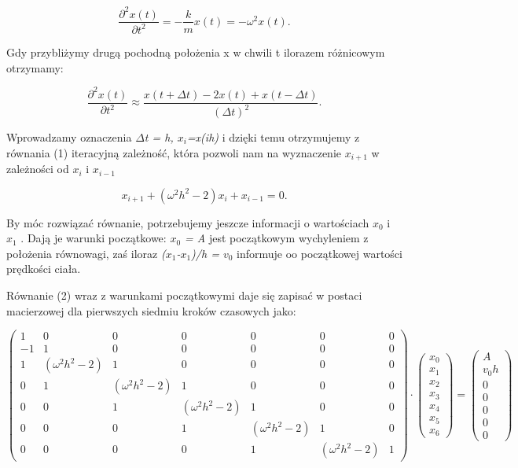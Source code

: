\documentclass{article}
\begin{document}
\begin{equation}
\frac{\partial ^2 x(t)}{\partial t^2} = - \frac{k}{m}x(t) = -\omega^2 x(t).
\end{equation}

Gdy przybliżymy drugą pochodną położenia x w chwili t ilorazem różnicowym otrzymamy:

\begin{equation}
\frac{\partial ^2 x(t)}{\partial t^2} \approx \frac{x(t+\Delta t) - 2x(t) + x(t-\Delta t)}{(\Delta t)^2}.
\end{equation}

Wprowadzamy oznaczenia \textit{$\Delta$t = h, $x_{i}$=x(ih)}  i dzięki temu otrzymujemy z równania (1) iteracyjną zależność, która pozwoli nam na wyznaczenie \textit{$x_{i+1}$} w zależności od \textit{$x_{i}$} i \textit{$x_{i-1}$}

\begin{equation}
x_{i+1} + (\omega ^2 h^2 - 2) x_{i} + x_{i-1} = 0.
\end{equation}
\par

By móc rozwiązać równanie, potrzebujemy  jeszcze informacji o wartościach \textit{$x_{0}$} i \textit{$x_{1}$} . Dają je warunki początkowe: \textit{$x_{0}$ = A} jest początkowym wychyleniem z położenia równowagi, zaś iloraz \textit{($x_{1}$-$x_{1}$)/h = $v_{0}$} informuje oo początkowej wartości prędkości ciała. \par
Równanie (2) wraz z warunkami początkowymi daje się zapisać w postaci macierzowej dla pierwszych siedmiu kroków czasowych jako:


\begin{equation}
	\begin{pmatrix}
		1 & 0 & 0 & 0 & 0 & 0 & 0 \\
		-1 & 1 & 0 & 0 & 0 & 0 & 0 \\
		1 & (\omega ^2 h^2 -2) & 1 & 0 & 0 & 0 & 0 \\
		0 & 1 & (\omega ^2 h^2 -2) & 1 & 0 & 0 & 0 \\
		0 & 0 & 1 & (\omega ^2 h^2 -2) & 1 & 0 & 0 \\
		0 & 0 & 0 & 1 & (\omega ^2 h^2 -2)& 1 & 0 \\
		0 & 0 & 0 & 0 & 1 &(\omega ^2 h^2 -2) & 1 
	\end{pmatrix} 
	\cdot
	\begin{pmatrix}
		x_{0} \\
		x_{1} \\
		x_{2} \\
		x_{3} \\
		x_{4} \\
		x_{5} \\
		x_{6} 
	\end{pmatrix}
	=
	\begin{pmatrix}
		A \\
		v_{0} h \\
		0 \\
		0\\
		0 \\
		0 \\
		0
	\end{pmatrix}
\end{equation}
\end{document}
